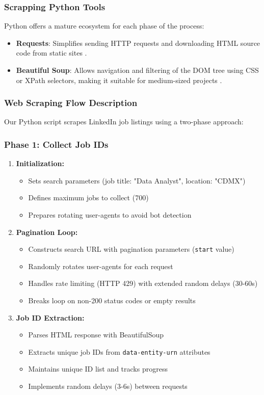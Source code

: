 \documentclass[runningheads]{llncs}
\begin{document}
\subsubsection{Scrapping Python Tools}
Python offers a mature ecosystem for each phase of the process:

\begin{itemize}
	\item \textbf{Requests}: Simplifies sending HTTP requests and downloading HTML source code from static sites \cite{Mitchell2018}.
	\item \textbf{Beautiful Soup}: Allows navigation and filtering of the DOM tree using CSS or XPath selectors, making it suitable for medium-sized projects \cite{Mitchell2018}.
\end{itemize}

\subsubsection{Web Scraping Flow Description}
Our Python script scrapes LinkedIn job listings using a two-phase approach:

\subsubsection{Phase 1: Collect Job IDs}
\begin{enumerate}[leftmargin=*]
	\item \textbf{Initialization:}
	\begin{itemize}
		\item Sets search parameters (job title: "Data Analyst", location: "CDMX")
		\item Defines maximum jobs to collect (700)
		\item Prepares rotating user-agents to avoid bot detection
	\end{itemize}
	
	\item \textbf{Pagination Loop:}
	\begin{itemize}
		\item Constructs search URL with pagination parameters (\texttt{start} value)
		\item Randomly rotates user-agents for each request
		\item Handles rate limiting (HTTP 429) with extended random delays (30-60s)
		\item Breaks loop on non-200 status codes or empty results
	\end{itemize}
	
	\item \textbf{Job ID Extraction:}
	\begin{itemize}
		\item Parses HTML response with BeautifulSoup
		\item Extracts unique job IDs from \texttt{data-entity-urn} attributes
		\item Maintains unique ID list and tracks progress
		\item Implements random delays (3-6s) between requests
	\end{itemize}
\end{enumerate}
\end{document}
